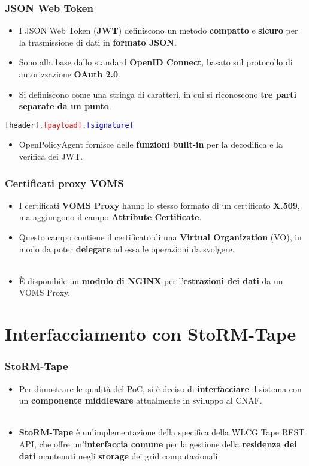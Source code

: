 \documentclass{beamer}
\begin{document}
\begin{frame}
  \frametitle{JSON Web Token}
  \begin{itemize}
    \item I JSON Web Token (\textbf{JWT}) definiscono un metodo \textbf{compatto} e \textbf{sicuro} per la trasmissione di dati
     in \textbf{formato JSON}.
    \item Sono alla base dallo standard \textbf{OpenID Connect}, basato sul protocollo di autorizzazione \textbf{OAuth 2.0}. 
    \item Si definiscono come una stringa di caratteri, in cui si riconoscono \textbf{tre parti separate da un punto}. 
  \end{itemize}  
  \hfill
  \centerline{\texttt{\textcolor{ao(english)}{[header]}.\textcolor{red}{[payload]}.\textcolor{blue}{[signature]}}}
  \begin{itemize}
    \item OpenPolicyAgent fornisce delle \textbf{funzioni built-in} per la decodifica e la verifica dei JWT. 
  \end{itemize}  
\end{frame}

\begin{frame}
  \frametitle{Certificati proxy VOMS}
  \begin{itemize}
    \item I certificati \textbf{VOMS Proxy} hanno lo stesso formato di un certificato \textbf{X.509}, ma aggiungono il campo \textbf{Attribute Certificate}.
    \item Questo campo contiene il certificato di una \textbf{Virtual Organization} (VO), in modo da poter \textbf{delegare} ad essa le operazioni da svolgere. 
    \\~\
    \item È disponibile un \textbf{modulo di NGINX} per l'\textbf{estrazioni dei dati} da un VOMS Proxy. 
  \end{itemize} 
  
\end{frame}

\section[Storm-Tape]{Interfacciamento con StoRM-Tape}
\begin{frame}
  \frametitle{StoRM-Tape}
\begin{itemize}
  \item Per dimostrare le qualità del PoC, si è deciso di \textbf{interfacciare} il sistema con un \textbf{componente middleware} attualmente in sviluppo al CNAF.  
  \\~\
  \item \textbf{StoRM-Tape} è un'implementazione della specifica della WLCG Tape REST API, che offre
  un'\textbf{interfaccia comune} per la gestione della \textbf{residenza dei dati} mantenuti negli \textbf{storage} dei grid computazionali.
\end{itemize}
\end{frame}
\end{document}
